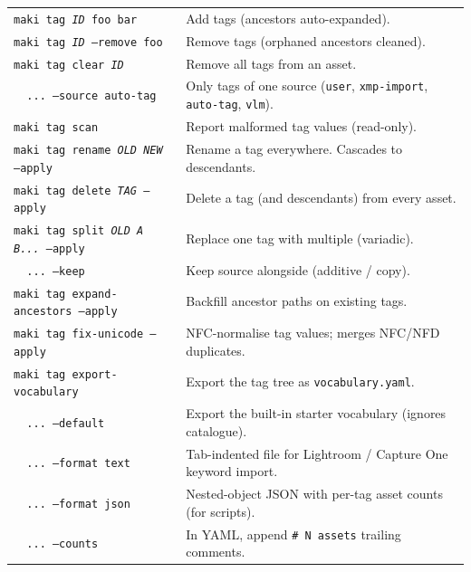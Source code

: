 \documentclass[a3paper,landscape,10pt]{article}
\newcommand{\cmd}[1]{\texttt{\small #1}}
\begin{document}
\renewcommand{\arraystretch}{1.15}
\noindent
\begin{minipage}[t]{0.50\textwidth}
  \small
  \begin{tabularx}{\textwidth}{@{}l >{\RaggedRight\arraybackslash}X@{}}
    \cmd{maki tag \textit{ID} foo bar}            & Add tags (ancestors auto-expanded). \\
    \cmd{maki tag \textit{ID} --remove foo}       & Remove tags (orphaned ancestors cleaned). \\
    \cmd{maki tag clear \textit{ID}}              & Remove all tags from an asset. \\
    \cmd{~~...\ --source auto-tag}                & Only tags of one source (\cmd{user}, \cmd{xmp-import}, \cmd{auto-tag}, \cmd{vlm}). \\
    \cmd{maki tag scan}                           & Report malformed tag values (read-only). \\
    \cmd{maki tag rename \textit{OLD} \textit{NEW} --apply} & Rename a tag everywhere. Cascades to descendants. \\
    \cmd{maki tag delete \textit{TAG} --apply}    & Delete a tag (and descendants) from every asset. \\
    \cmd{maki tag split \textit{OLD} \textit{A B...} --apply} & Replace one tag with multiple (variadic). \\
    \cmd{~~...\ --keep}                           & Keep source alongside (additive / copy). \\
    \cmd{maki tag expand-ancestors --apply}       & Backfill ancestor paths on existing tags. \\
    \cmd{maki tag fix-unicode --apply}            & NFC-normalise tag values; merges NFC/NFD duplicates. \\
    \cmd{maki tag export-vocabulary}              & Export the tag tree as \cmd{vocabulary.yaml}. \\
    \cmd{~~...\ --default}                        & Export the built-in starter vocabulary (ignores catalogue). \\
    \cmd{~~...\ --format text}                    & Tab-indented file for Lightroom / Capture One keyword import. \\
    \cmd{~~...\ --format json}                    & Nested-object JSON with per-tag asset counts (for scripts). \\
    \cmd{~~...\ --counts}                         & In YAML, append \cmd{\# N assets} trailing comments. \\
  \end{tabularx}
\end{minipage}\hfill
\end{document}
